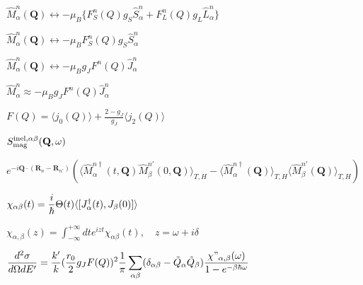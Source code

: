 \documentclass[twoside]{article}
\def\lthtmlcheckvsize{\ifdim\ht\sizebox<\vsize 
  \ifdim\wd\sizebox<\hsize\expandafter\hfill\fi \expandafter\vfill
  \else\expandafter\vss\fi}%
\begin{document}
{\newpage\clearpage
{}%
$\hat M^{n}_{\alpha}(\mathbf Q) \leftrightarrow -\mu_B
\{ F^n_S(Q) g_S \hat S^{n}_{\alpha} + F^n_L(Q) g_L \hat L^{n}_{\alpha} \}$%
\lthtmlindisplaymathZ
\lthtmlcheckvsize\clearpage}

{\newpage\clearpage
{}%
$\hat M^{n}_{\alpha}(\mathbf Q) \leftrightarrow -\mu_B
F^n_S(Q) g_S \hat S^{n}_{\alpha}$%
\lthtmlindisplaymathZ
\lthtmlcheckvsize\clearpage}

{\newpage\clearpage
{}%
$\hat M^{n}_{\alpha}(\mathbf Q) \leftrightarrow -\mu_B
 g_J F^n(Q) \hat J_{\alpha}^n$%
\lthtmlindisplaymathZ
\lthtmlcheckvsize\clearpage}

{\newpage\clearpage
{}%
$\hat M^{n}_{\alpha} \approx -\mu_B g_J F^n(Q)  \hat J_{\alpha}^n $%
\lthtmlindisplaymathZ
\lthtmlcheckvsize\clearpage}

{\newpage\clearpage
{}%
$F(Q)=\langle j_0 (Q) \rangle + \frac{2-g_J}{g_J}\langle j_2 (Q) \rangle $%
\lthtmlindisplaymathZ
\lthtmlcheckvsize\clearpage}

{\newpage\clearpage
{}%
$\displaystyle S_{\rm mag}^{\rm inel,\alpha\beta}(\mathbf Q,\omega)$%
\lthtmlindisplaymathZ
\lthtmlcheckvsize\clearpage}

{\newpage\clearpage
{}%
$\displaystyle e^{-i\mathbf Q \cdot (\mathbf R_n-\mathbf R_{n'})}   (\langle \hat M_{\alpha}^{n \dag }(t,\mathbf Q)  \hat M_{\beta}^{n'}(0,\mathbf Q) \rangle_{T,H}
- \langle \hat M^{n \dag }_{\alpha}(\mathbf Q)\rangle_{T,H} \langle \hat M^{n'}_{\beta}(\mathbf Q) \rangle_{T,H})$%
\lthtmlindisplaymathZ
\lthtmlcheckvsize\clearpage}

{\newpage\clearpage
{}%
$\displaystyle \chi_{\alpha\beta}(t)={i\over \hbar} \Theta(t)\langle [J^\dagger_\alpha(t), J_\beta(0)]\rangle 
$%
\lthtmlindisplaymathZ
\lthtmlcheckvsize\clearpage}

{\newpage\clearpage
{}%
$\displaystyle \chi_{\alpha,\beta}(z)=\int_{-\infty}^{+\infty} dt e^{izt}\chi_{\alpha\beta}(t), \quad z=\omega
+i\delta 
$%
\lthtmlindisplaymathZ
\lthtmlcheckvsize\clearpage}

{\newpage\clearpage
{}%
$\displaystyle {d^2\sigma \over d\Omega d E'}=  {k' \over
k}({r_0\over 2}g_J F(Q))^2{1\over \pi }
\sum_{\alpha\beta}(\delta_{\alpha\beta} 
- \tilde Q_\alpha \tilde Q_\beta)
{ \chi{"}_{\alpha,\beta}(\omega)\over 1-e^{-\beta \hbar \omega}} 
$%
\lthtmlindisplaymathZ
\lthtmlcheckvsize\clearpage}
\end{document}
